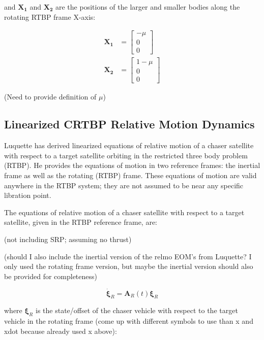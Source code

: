 \documentclass[]{article}
\begin{document}
and \(\mathbf{X_1}\) and \(\mathbf{X_2}\) are the positions of the larger and smaller bodies along the rotating RTBP frame X-axis:

\begin{equation*}
\begin{aligned}
\mathbf{X_1} &= \begin{bmatrix}
						-\mu \\ 0 \\ 0 
						\end{bmatrix} \\
\mathbf{X_2} &= \begin{bmatrix}
						1 - \mu \\ 0 \\ 0
						\end{bmatrix}
\end{aligned}
\end{equation*}

(Need to provide definition of \(\mu\))

\subsection{Linearized CRTBP Relative Motion Dynamics}
Luquette has derived linearized equations of relative motion of a chaser satellite with respect to a target satellite orbiting in the restricted three body problem (RTBP).  He provides the equations of motion in two reference frames: the inertial frame as well as the rotating (RTBP) frame.  These equations of motion are valid anywhere in the RTBP system; they are not assumed to be near any specific libration point.

The equations of relative motion of a chaser satellite with respect to a target satellite, given in the RTBP reference frame, are:

(not including SRP; assuming no thrust)

(should I also include the inertial version of the relmo EOM's from Luquette?  I only used the rotating frame version, but maybe the inertial version should also be provided for completeness)

\begin{equation} \label{eq:RelmoDerivs}
\dot{\boldsymbol{\xi}}_R = \mathbf{A}_R(t)\boldsymbol{\xi}_R
\end{equation}

where \(\boldsymbol{\xi}_R\) is the state/offset of the chaser vehicle with respect to the target vehicle in the rotating frame (come up with different symbols to use than x and xdot because already used x above):
\end{document}

